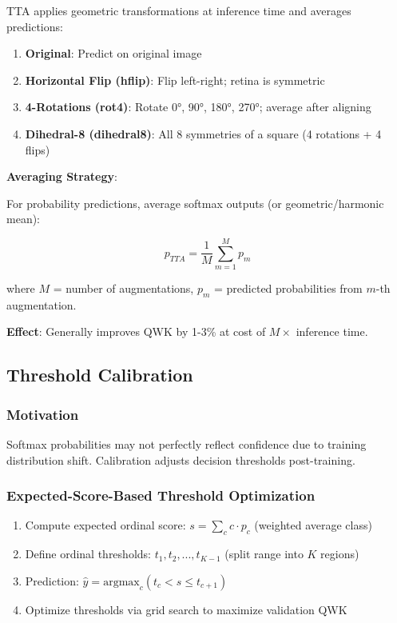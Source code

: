 TTA applies geometric transformations at inference time and averages predictions:

\begin{enumerate}
    \item \textbf{Original}: Predict on original image
    
    \item \textbf{Horizontal Flip (hflip)}: Flip left-right; retina is symmetric
    
    \item \textbf{4-Rotations (rot4)}: Rotate 0°, 90°, 180°, 270°; average after aligning
    
    \item \textbf{Dihedral-8 (dihedral8)}: All 8 symmetries of a square (4 rotations + 4 flips)
\end{enumerate}

\textbf{Averaging Strategy}:

For probability predictions, average softmax outputs (or geometric/harmonic mean):

\begin{equation}
p_{TTA} = \frac{1}{M} \sum_{m=1}^{M} p_m
\end{equation}

where $M$ = number of augmentations, $p_m$ = predicted probabilities from $m$-th augmentation.

\textbf{Effect}: Generally improves QWK by 1-3\% at cost of $M \times$ inference time.

\subsection{Threshold Calibration}

\subsubsection{Motivation}

Softmax probabilities may not perfectly reflect confidence due to training distribution shift. Calibration adjusts decision thresholds post-training.

\subsubsection{Expected-Score-Based Threshold Optimization}

\begin{enumerate}
    \item Compute expected ordinal score: $s = \sum_c c \cdot p_c$ (weighted average class)
    
    \item Define ordinal thresholds: $t_1, t_2, ..., t_{K-1}$ (split range into $K$ regions)
    
    \item Prediction: $\hat{y} = \text{argmax}_c (t_c < s \leq t_{c+1})$
    
    \item Optimize thresholds via grid search to maximize validation QWK
\end{enumerate}

